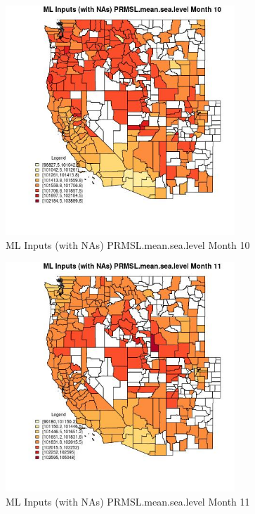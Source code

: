 \begin{figure} 
\centering  
\includegraphics[width=0.77\textwidth]{Code_Outputs/Report_ML_input_PM25_Step4_part_f_de_duplicated_aveswNAs_CountyPRMSLmeansealevelmedianMonth10.jpg} 
\caption{\label{fig:Report_ML_input_PM25_Step4_part_f_de_duplicated_aveswNAsCountyPRMSLmeansealevelmedianMonth10}ML Inputs (with NAs) PRMSL.mean.sea.level Month 10} 
\end{figure} 
 

\begin{figure} 
\centering  
\includegraphics[width=0.77\textwidth]{Code_Outputs/Report_ML_input_PM25_Step4_part_f_de_duplicated_aveswNAs_CountyPRMSLmeansealevelmedianMonth11.jpg} 
\caption{\label{fig:Report_ML_input_PM25_Step4_part_f_de_duplicated_aveswNAsCountyPRMSLmeansealevelmedianMonth11}ML Inputs (with NAs) PRMSL.mean.sea.level Month 11} 
\end{figure} 
 


